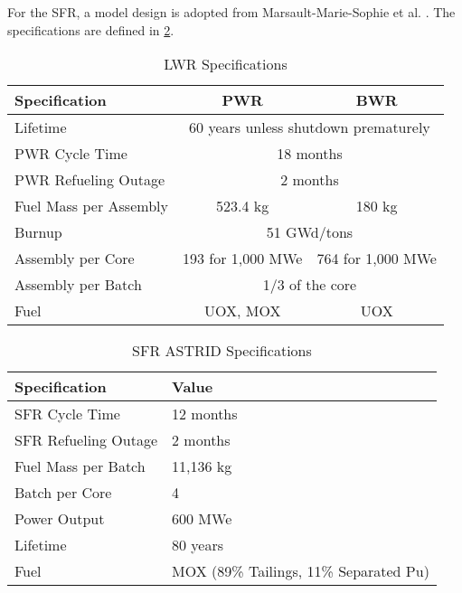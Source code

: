 For the \gls{SFR}, a model design is adopted from
Marsault-Marie-Sophie et al. \cite{varaine_pre-conceptual_2012}.
The specifications are defined in \cref{tab:sfr}.

\begin{table}[h]
	\centering
	\begin{tabularx}{\textwidth}{bcc}
		\hline
		\textbf{Specification} & \textbf{\gls{PWR}} & \textbf{\gls{BWR}} \\
		\hline
		Lifetime & \multicolumn{2}{c}{60 years unless shutdown prematurely} \\
		PWR Cycle Time & \multicolumn{2}{c}{18 months}\\ 
		PWR Refueling Outage & \multicolumn{2}{c}{2 months} \\
		Fuel Mass per Assembly & 523.4 kg & 180 kg \\
		Burnup & \multicolumn{2}{c}{51 GWd/tons }\\
		Assembly per Core & 193 for 1,000 MWe & 764 for 1,000 MWe\\
		Assembly per Batch & \multicolumn{2}{c}{1/3 of the core }\\
		Fuel & \gls{UOX}, \gls{MOX} & \gls{UOX} \\
		\hline
	\end{tabularx}
	\caption {\gls{LWR} Specifications}
	\label{tab:lwr}
	\end{table}
	
\begin{table}[h]
	\centering
	\begin{tabularx}{\textwidth}{bb}
		\hline
		\textbf{Specification} &\textbf{ Value} \\
		\hline
		SFR Cycle Time & 12 months \\ 
		SFR Refueling Outage & 2 months \\
		Fuel Mass per Batch & 11,136 kg \\
		Batch per Core & 4 \\
		Power Output & 600 MWe \\
		Lifetime & 80 years \\
		Fuel & {\small \gls{MOX} (89\% Tailings, 11\% Separated Pu)}\\
		\hline
	\end{tabularx}
	\caption {\gls{SFR} ASTRID Specifications \cite{varaine_pre-conceptual_2012}}
	\label{tab:sfr}
\end{table}
\FloatBarrier

